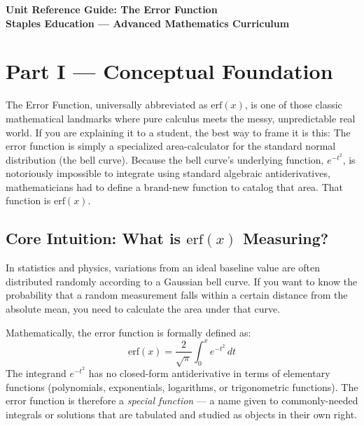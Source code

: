 \documentclass[11pt]{article}
\begin{document}
\setcounter{secnumdepth}{2}
\setcounter{tocdepth}{2}

\begin{center}
    \LARGE\bfseries\color{headerblue} Unit Reference Guide: The Error Function
    \vspace{0.5em} \\
    \large\normalfont Staples Education --- Advanced Mathematics Curriculum
\end{center}
\vspace{1em}

\tableofcontents
\vspace{2em}

{}
\section*{Part I --- Conceptual Foundation}
\setcounter{section}{1}

The Error Function, universally abbreviated as $\text{erf}(x)$, is one of those classic mathematical landmarks where pure calculus meets the messy, unpredictable real world. If you are explaining it to a student, the best way to frame it is this: The error function is simply a specialized area-calculator for the standard normal distribution (the bell curve). Because the bell curve's underlying function, $e^{-t^2}$, is notoriously impossible to integrate using standard algebraic antiderivatives, mathematicians had to define a brand-new function to catalog that area. That function is $\text{erf}(x)$.

\subsection{Core Intuition: What is $\text{erf}(x)$ Measuring?}

In statistics and physics, variations from an ideal baseline value are often distributed randomly according to a Gaussian bell curve. If you want to know the probability that a random measurement falls within a certain distance from the absolute mean, you need to calculate the area under that curve.

\begin{defnbox}
Mathematically, the error function is formally defined as:
\[ \text{erf}(x) = \frac{2}{\sqrt{\pi}} \int_{0}^{x} e^{-t^2} \, dt \]
The integrand $e^{-t^2}$ has no closed-form antiderivative in terms of elementary functions (polynomials, exponentials, logarithms, or trigonometric functions). The error function is therefore a \textit{special function} --- a name given to commonly-needed integrals or solutions that are tabulated and studied as objects in their own right.
\end{defnbox}
\end{document}
